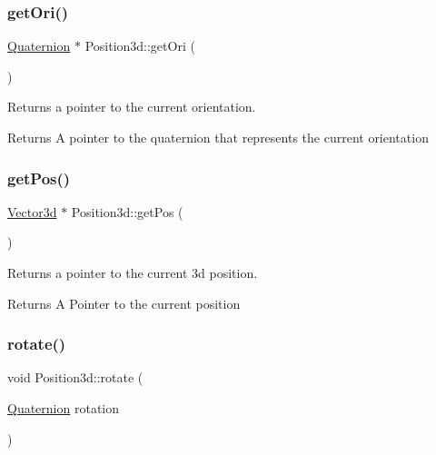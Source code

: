 \subsubsection{\texorpdfstring{get\+Ori()}{getOri()}}
{\footnotesize\ttfamily \hyperlink{structQuaternion}{Quaternion} $\ast$ Position3d\+::get\+Ori (\begin{DoxyParamCaption}{ }\end{DoxyParamCaption})}



Returns a pointer to the current orientation. 

\begin{DoxyReturn}{Returns}
A pointer to the quaternion that represents the current orientation 
\end{DoxyReturn}
\mbox{\label{classPosition3d_a4e9f764486d20a713596e7d4324f16f4}} 
\subsubsection{\texorpdfstring{get\+Pos()}{getPos()}}
{\footnotesize\ttfamily \hyperlink{structVector3d}{Vector3d} $\ast$ Position3d\+::get\+Pos (\begin{DoxyParamCaption}{ }\end{DoxyParamCaption})}



Returns a pointer to the current 3d position. 

\begin{DoxyReturn}{Returns}
A Pointer to the current position 
\end{DoxyReturn}
\mbox{\label{classPosition3d_afcbb1fe0cffcaae431822d44a3579f90}} 
\subsubsection{\texorpdfstring{rotate()}{rotate()}}
{\footnotesize\ttfamily void Position3d\+::rotate (\begin{DoxyParamCaption}\item[{\hyperlink{structQuaternion}{Quaternion}}]{rotation }\end{DoxyParamCaption})}




